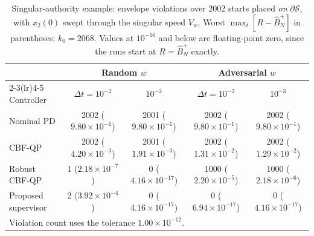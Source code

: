 \begin{table}[!t]
\caption{Singular-authority example: envelope violations over 2002 starts placed
\emph{on} $\partial\mathcal{S}$, with $x_2(0)$ swept through the singular speed
$V_w$. Worst $\max_t[R-\widehat B_N^+]$ in parentheses; $k_0=2068$. Values at
$10^{-16}$ and below are floating-point zero, since the runs start at $R=\widehat
B_N^+$ exactly.}
\label{tab:sg_boundary}
\centering\footnotesize
\begin{tabular}{lcccc}
\hline
& \multicolumn{2}{c}{Random $w$} & \multicolumn{2}{c}{Adversarial $w$} \\
\cmidrule(lr){2-3}\cmidrule(lr){4-5}
Controller & $\Delta t=10^{-2}$ & $10^{-3}$ & $\Delta t=10^{-2}$ & $10^{-3}$ \\ \hline
Nominal PD & 2002 (${9.80\times10^{-1}}$) & 2001 (${9.80\times10^{-1}}$) & 2002 (${9.80\times10^{-1}}$) & 2002 (${9.80\times10^{-1}}$) \\
CBF-QP & 2002 (${4.20\times10^{-3}}$) & 2001 (${1.91\times10^{-3}}$) & 2002 (${1.31\times10^{-2}}$) & 2002 (${1.29\times10^{-2}}$) \\
Robust CBF-QP & 1 (${2.18\times10^{-7}}$) & 0 (${4.16\times10^{-17}}$) & 1000 (${2.20\times10^{-5}}$) & 1000 (${2.18\times10^{-6}}$) \\
Proposed supervisor & 2 (${3.92\times10^{-4}}$) & 0 (${4.16\times10^{-17}}$) & 0 (${6.94\times10^{-17}}$) & 0 (${4.16\times10^{-17}}$) \\
\hline
\multicolumn{5}{l}{Violation count uses the tolerance $1.00\times10^{-12}$.} \\
\hline
\end{tabular}
\end{table}
